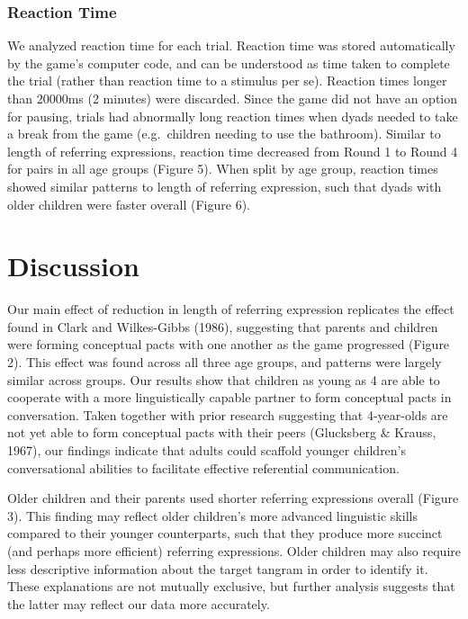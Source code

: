 \documentclass[10pt, letterpaper]{article}
\begin{document}
\hypertarget{reaction-time}{%
\subsubsection{Reaction Time}\label{reaction-time}}

We analyzed reaction time for each trial. Reaction time was stored
automatically by the game's computer code, and can be understood as time
taken to complete the trial (rather than reaction time to a stimulus per
se). Reaction times longer than 20000ms (2 minutes) were discarded.
Since the game did not have an option for pausing, trials had abnormally
long reaction times when dyads needed to take a break from the game
(e.g.~children needing to use the bathroom). Similar to length of
referring expressions, reaction time decreased from Round 1 to Round 4
for pairs in all age groups (Figure 5). When split by age group,
reaction times showed similar patterns to length of referring
expression, such that dyads with older children were faster overall
(Figure 6).

\hypertarget{discussion}{%
\section{Discussion}\label{discussion}}

Our main effect of reduction in length of referring expression
replicates the effect found in Clark and Wilkes-Gibbs (1986), suggesting
that parents and children were forming conceptual pacts with one another
as the game progressed (Figure 2). This effect was found across all
three age groups, and patterns were largely similar across groups. Our
results show that children as young as 4 are able to cooperate with a
more linguistically capable partner to form conceptual pacts in
conversation. Taken together with prior research suggesting that
4-year-olds are not yet able to form conceptual pacts with their peers
(Glucksberg \& Krauss, 1967), our findings indicate that adults could
scaffold younger children's conversational abilities to facilitate
effective referential communication.

Older children and their parents used shorter referring expressions
overall (Figure 3). This finding may reflect older children's more
advanced linguistic skills compared to their younger counterparts, such
that they produce more succinct (and perhaps more efficient) referring
expressions. Older children may also require less descriptive
information about the target tangram in order to identify it. These
explanations are not mutually exclusive, but further analysis suggests
that the latter may reflect our data more accurately.
\end{document}
